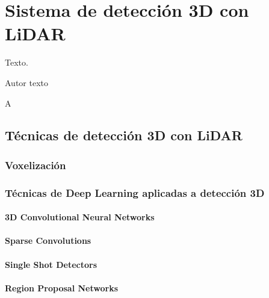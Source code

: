 \chapter{Sistema de detección 3D con LiDAR}
\label{cha:Sistema de detección 3D con LiDAR}

\begin{FraseCelebre}
  \begin{Frase}
    Texto.
  \end{Frase}
  \begin{Fuente}
    Autor texto
  \end{Fuente}
\end{FraseCelebre}

\noindent
A

\section{Técnicas de detección 3D con LiDAR}
\label{sec:Técnicas de detección 3D con LiDAR}

\subsection{Voxelización}
\label{sec:Voxelización}

\subsection{Técnicas de Deep Learning aplicadas a detección 3D}
\label{sec:Técnicas de Deep Learning aplicadas a detección 3D}

\subsubsection{3D Convolutional Neural Networks}
\label{sec:3D Convolutional Neural Networks}

\subsubsection{Sparse Convolutions}
\label{sec:Sparse Convolutions}

\subsubsection{Single Shot Detectors}
\label{sec:Single Shot Detectors}

\subsubsection{Region Proposal Networks}
\label{sec:Region Proposal Networks}

